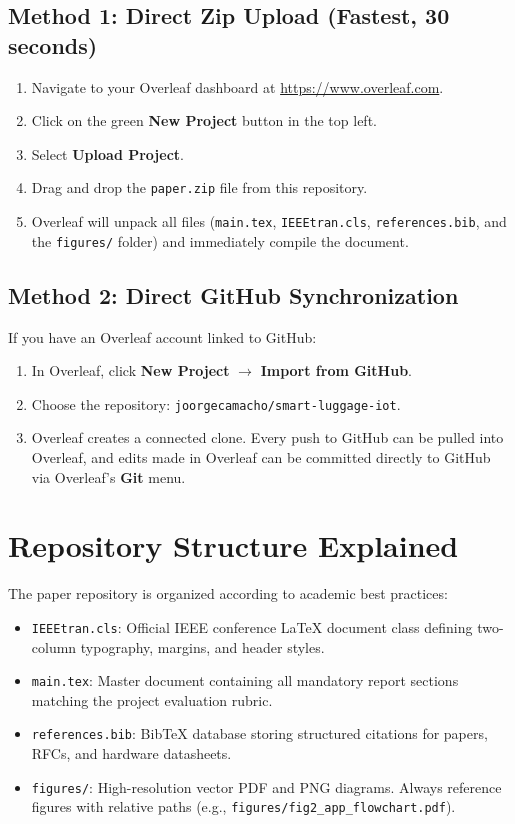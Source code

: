 \documentclass[conference]{IEEEtran}
\begin{document}
\subsection{Method 1: Direct Zip Upload (Fastest, 30 seconds)}
\begin{enumerate}
    \item Navigate to your Overleaf dashboard at \url{https://www.overleaf.com}.
    \item Click on the green \textbf{New Project} button in the top left.
    \item Select \textbf{Upload Project}.
    \item Drag and drop the \texttt{paper.zip} file from this repository.
    \item Overleaf will unpack all files (\texttt{main.tex}, \texttt{IEEEtran.cls}, \texttt{references.bib}, and the \texttt{figures/} folder) and immediately compile the document.
\end{enumerate}

\subsection{Method 2: Direct GitHub Synchronization}
If you have an Overleaf account linked to GitHub:
\begin{enumerate}
    \item In Overleaf, click \textbf{New Project} $\rightarrow$ \textbf{Import from GitHub}.
    \item Choose the repository: \texttt{joorgecamacho/smart-luggage-iot}.
    \item Overleaf creates a connected clone. Every push to GitHub can be pulled into Overleaf, and edits made in Overleaf can be committed directly to GitHub via Overleaf's \textbf{Git} menu.
\end{enumerate}

\section{Repository Structure Explained}
The paper repository is organized according to academic best practices:
\begin{itemize}
    \item \texttt{IEEEtran.cls}: Official IEEE conference LaTeX document class defining two-column typography, margins, and header styles.
    \item \texttt{main.tex}: Master document containing all mandatory report sections matching the project evaluation rubric.
    \item \texttt{references.bib}: BibTeX database storing structured citations for papers, RFCs, and hardware datasheets.
    \item \texttt{figures/}: High-resolution vector PDF and PNG diagrams. Always reference figures with relative paths (e.g., \texttt{figures/fig2\_app\_flowchart.pdf}).
\end{itemize}
\end{document}
